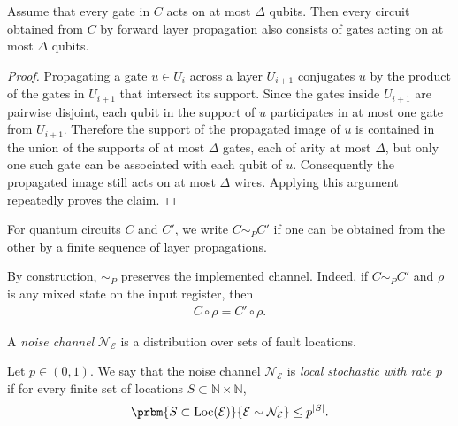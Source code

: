 \begin{claim}
  \label{claim:layer_fanin}
  Assume that every gate in $C$ acts on at most $\Delta$ qubits. Then every circuit obtained from $C$ by forward layer propagation also consists of gates acting on at most $\Delta$ qubits.
\end{claim}
\begin{proof}
  Propagating a gate $u\in U_i$ across a layer $U_{i+1}$ conjugates $u$ by the product of the gates in $U_{i+1}$ that intersect its support. Since the gates inside $U_{i+1}$ are pairwise disjoint, each qubit in the support of $u$ participates in at most one gate from $U_{i+1}$. Therefore the support of the propagated image of $u$ is contained in the union of the supports of at most $\Delta$ gates, each of arity at most $\Delta$, but only one such gate can be associated with each qubit of $u$. Consequently the propagated image still acts on at most $\Delta$ wires. Applying this argument repeatedly proves the claim.
\end{proof}

\begin{definition}[$C\sim_{P}C'$]
  For quantum circuits $C$ and $C'$, we write $C\sim_{P}C'$ if one can be obtained from the other by a finite sequence of layer propagations.
\end{definition}

By construction, $\sim_{P}$ preserves the implemented channel. Indeed, if $C\sim_{P}C'$ and $\rho$ is any mixed state on the input register, then
\begin{equation*}
  \begin{split}
    C\circ \rho = C'\circ \rho.
  \end{split}
\end{equation*}

\begin{definition}
  A \textit{noise channel} $\mathcal{N}_{\mathcal{E}}$ is a distribution over sets of fault locations.
\end{definition}

\begin{definition}
  Let $p\in(0,1)$. We say that the noise channel $\mathcal{N}_{\mathcal{E}}$ is \textit{local stochastic with rate $p$} if for every finite set of locations $S\subset \mathbb{N}\times \mathbb{N}$,
  \begin{equation*}
    \begin{split}
      \prbm{S\subset \operatorname{Loc}(\mathcal{E})}{\mathcal{E}\sim \mathcal{N}_{\mathcal{E}}}
      \le p^{|S|}.
    \end{split}
  \end{equation*}
\end{definition}

